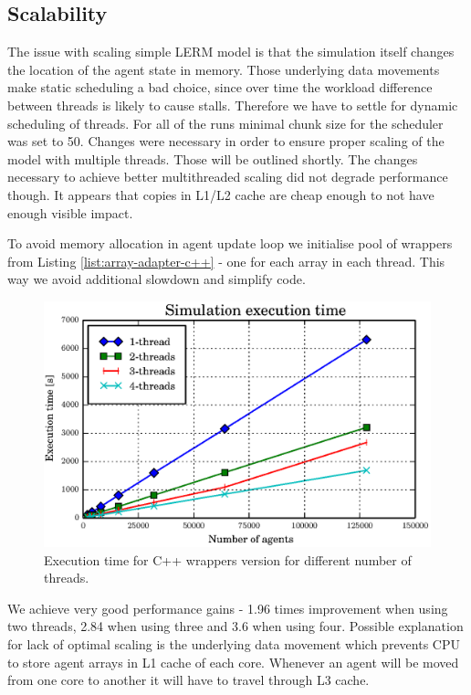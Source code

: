 \documentclass[12pt, a4paper]{report}
\begin{document}
\subsection{Scalability}\label{subsec:embed-c++-scala}
The issue with scaling simple LERM model is that the simulation itself changes the
location of the agent state in memory. Those underlying data movements make
static scheduling a bad choice, since over time the workload difference between threads
is likely to cause stalls. Therefore we have to settle for dynamic scheduling
of threads. For all of the runs minimal chunk size for the scheduler was set to 50.
Changes were necessary in order to ensure proper scaling of the model with multiple
threads. Those will be outlined shortly. The changes necessary to achieve better
multithreaded scaling did not degrade performance though. It appears that copies
in L1/L2 cache are cheap enough to not have enough visible impact.

To avoid memory allocation in agent update loop we initialise pool of wrappers from
Listing \ref{list:array-adapter-c++} - one for each array in each thread. This way
we avoid additional slowdown and simplify code.

\begin{figure}[H]
  \begin{center}
    \includegraphics[width=\columnwidth]{graphs/gil-free-multi-4-perf.eps}
    \caption{Execution time for C++ wrappers version for different number of threads.}
    \label{fig:gil-free-multi-4-perf}
  \end{center}
\end{figure}

We achieve very good performance gains - 1.96 times improvement when using two threads,
2.84 when using three and 3.6 when using four. Possible explanation for lack of optimal
scaling is the underlying data movement which prevents CPU to store agent arrays in L1
cache of each core. Whenever an agent will be moved from one core to another it will
have to travel through L3 cache.
\end{document}
